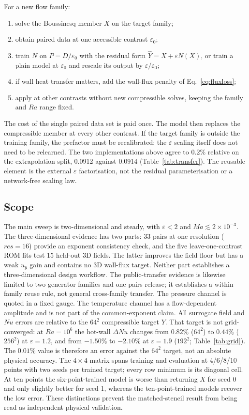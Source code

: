 \documentclass[preprint,11pt,a4paper,times]{elsarticle}
\begin{document}
For a new flow family:
\begin{enumerate}
\item solve the Boussinesq member $X$ on the target family;
\item obtain paired data at one accessible contrast $\varepsilon_0$;
\item train $N$ on $P=D/\varepsilon_0$ with the residual form $\hat Y=X+\varepsilon N(X)$,
or train a plain model at $\varepsilon_0$ and rescale its output by
$\varepsilon/\varepsilon_0$;
\item if wall heat transfer matters, add the wall-flux penalty of Eq.~\eqref{eq:fluxloss};
\item apply at other contrasts without new compressible solves, keeping the family and $Ra$
range fixed.
\end{enumerate}
The cost of the single paired data set is paid once. The model then replaces the compressible
member at every other contrast. If the target family is outside the training family, the
prefactor must be recalibrated; the $\varepsilon$ scaling itself does not need to be relearned.
The two implementations above agree to $0.2\%$ relative on the extrapolation split, 0.0912
against 0.0914 (Table~\ref{tab:transfer}). The reusable element is the external $\varepsilon$ factorisation,
not the residual parameterisation or a network-free scaling law.

\subsection{Scope}

The main sweep is two-dimensional and steady, with $\varepsilon<2$ and
$Ma\lesssim2\times10^{-3}$. The three-dimensional evidence has two parts: 33 pairs at one
resolution ($res=16$) provide an exponent consistency check, and the five leave-one-contrast
ROM fits test 15 held-out 3D fields. The latter improves the field floor but has a weak $u_y$
gain and contains no 3D wall-flux target. Neither part establishes a three-dimensional design
workflow. The public-transfer evidence is likewise limited to two generator families and one
pairs release; it establishes a within-family reuse rule, not general cross-family transfer.
The pressure channel is quoted in a fixed gauge. The temperature channel has a flow-dependent
amplitude and is not part of the common-exponent claim. All surrogate field and $Nu$ errors
are relative to the $64^2$ compressible target $Y$. That target is not grid-converged: at
$Ra=10^6$ the hot-wall $\Delta Nu$ changes from $0.82\%$ ($64^2$) to $0.44\%$ ($256^2$) at
$\varepsilon=1.2$, and from $-1.50\%$ to $-2.10\%$ at $\varepsilon=1.9$ ($192^2$;
Table~\ref{tab:grid}). The $0.01\%$ value is therefore an error against the $64^2$ target, not
an absolute physical accuracy. The $4\times4$ matrix spans training and evaluation at
4/6/8/10 points with two seeds per trained target; every row minimum is its diagonal cell.
At ten points the six-point-trained model is worse than returning $X$ for seed 0 and only
slightly better for seed 1, whereas the ten-point-trained models recover the low error. These
distinctions prevent the matched-stencil result from being read as independent physical
validation.
\end{document}
